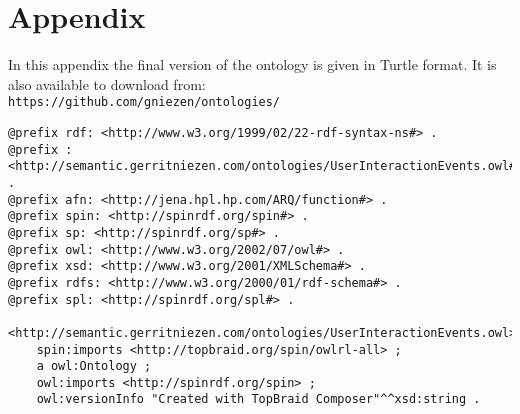 \manualmark
{} %
{}

\chapter*{Appendix}

In this appendix the final version of the ontology is given in Turtle format. It is also available to download from:\\

\verb+https://github.com/gniezen/ontologies/+

\footnotesize
\begin{verbatim}
@prefix rdf: <http://www.w3.org/1999/02/22-rdf-syntax-ns#> .
@prefix : <http://semantic.gerritniezen.com/ontologies/UserInteractionEvents.owl#> .
@prefix afn: <http://jena.hpl.hp.com/ARQ/function#> .
@prefix spin: <http://spinrdf.org/spin#> .
@prefix sp: <http://spinrdf.org/sp#> .
@prefix owl: <http://www.w3.org/2002/07/owl#> .
@prefix xsd: <http://www.w3.org/2001/XMLSchema#> .
@prefix rdfs: <http://www.w3.org/2000/01/rdf-schema#> .
@prefix spl: <http://spinrdf.org/spl#> .

<http://semantic.gerritniezen.com/ontologies/UserInteractionEvents.owl>
    spin:imports <http://topbraid.org/spin/owlrl-all> ;
    a owl:Ontology ;
    owl:imports <http://spinrdf.org/spin> ;
    owl:versionInfo "Created with TopBraid Composer"^^xsd:string .


\end{verbatim}
